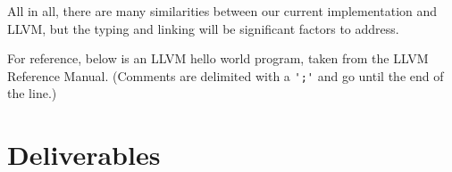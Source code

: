 \documentclass[11pt]{article}
\begin{document}
All in all, there are many similarities between our current
implementation and LLVM, but the typing and linking will be
significant factors to address.

For reference, below is an LLVM hello world program, taken from the
LLVM Reference Manual.  (Comments are delimited with a \verb|';'| and
go until the end of the line.)



\section{Deliverables}



\nocite{*} 

\end{document}
